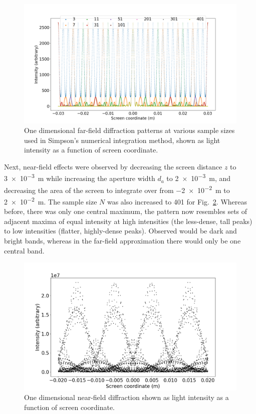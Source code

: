 \documentclass[hyphens,twocolumn,nobalancelastpage,aps,10pt,citeautoscript,longbibliography]{revtex4-2}
\begin{document}
\begin{figure}[htpb]
	\centering
	\includegraphics[width=1\linewidth]{./assets/diffraction_1d/points_ff.png}
	\caption{One dimensional far-field diffraction patterns at various sample sizes used in Simpson's numerical integration method, shown as light intensity as a function of screen coordinate.}%
	\label{fig:points_ff}
\end{figure}

Next, near-field effects were observed by decreasing the screen distance $z$ to
\qty{3e-3}{\metre} while increasing the aperture width $d_a$ to
\qty{2e-3}{\metre}, and decreasing the area of the screen to integrate over
from \qty{-2e-2}{\metre} to \qty{2e-2}{\metre}. The sample size $N$ was also
increased to 401 for Fig.~\ref{fig:intensity_nf}. Whereas before, there was
only one central maximum, the pattern now resembles sets of adjacent maxima of
equal intensity at high intensities (the less-dense, tall peaks) to low
intensities (flatter, highly-dense peaks). Observed would be dark and bright
bands, whereas in the far-field approximation there would only be one central
band.

\begin{figure}[htpb]
	\centering
	\includegraphics[width=1\linewidth]{./assets/diffraction_1d/intensity_nf_2.png}
	\caption{One dimensional near-field diffraction shown as light intensity as a function of screen coordinate.}%
	\label{fig:intensity_nf}
\end{figure}
\end{document}
